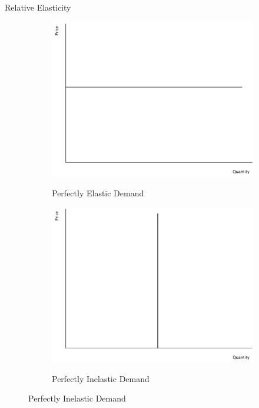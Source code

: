 \documentclass[xcolor={dvipsnames},pdf, hyperref={colorlinks=true, citecolor=ForestGreen, linkcolor=BlueViolet, urlcolor=Magenta}]{beamer}
\newcommand{\blank}[0]{}
\newcommand{\ddp}[1]{{\textcolor{ForestGreen}{#1}}}
\begin{document}
\begin{frame}{Relative Elasticity}
		\begin{figure}[H]
			\centering
			\caption{Extreme Cases}
			\blank\blank\blank\blank
			\begin{subfigure}{.5\textwidth}
			\ddp{\includegraphics[scale=.25]{plot24.pdf}}
				\caption{Perfectly Elastic Demand}
			\end{subfigure}%
			\begin{subfigure}{.5\textwidth}
				\centering
				\ddp{\includegraphics[scale=.25]{plot25.pdf}}
				\caption{Perfectly Inelastic Demand}
			\end{subfigure}
		\end{figure}

\end{frame}
\end{document}
